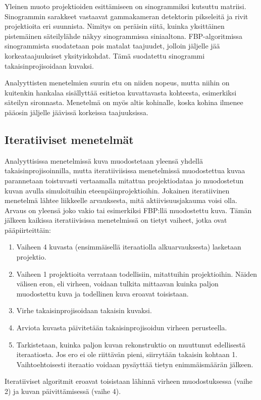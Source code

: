 Yleinen muoto projektioiden esittämiseen on sinogrammiksi kutsuttu matriisi. Sinogrammin sarakkeet vastaavat gammakameran detektorin pikseleitä ja rivit projektioita eri suunnista\cite{stiller_basics_2018}. Nimitys on peräisin siitä, kuinka yksittäinen pistemäinen säteilylähde näkyy sinogrammissa siniaaltona. FBP-algoritmissa sinogrammista suodatetaan pois matalat taajuudet, jolloin jäljelle jää korkeataajuuksiset yksityiskohdat. Tämä suodatettu sinogrammi takaisinprojisoidaan kuvaksi\cite{bruyant_analytic_2002, willemink_evolution_2019}.

Analyyttisten menetelmien suurin etu on niiden nopeus, mutta niihin on kuitenkin hankalaa sisällyttää esitietoa kuvattavasta kohteesta, esimerkiksi säteilyn sironnasta. Menetelmä on myös altis kohinalle, koska kohina ilmenee pääosin jäljelle jäävissä korkeissa taajuuksissa.\cite{bruyant_analytic_2002, willemink_evolution_2019, stiller_basics_2018}

\subsection{Iteratiiviset menetelmät}
Analyyttisissa menetelmissä kuva muodostetaan yleensä yhdellä takaisinprojisoinnilla, mutta iteratiiviisissa menetelmissä muodostettua kuvaa parannetaan toistuvasti vertaamalla mitattua projektiodataa jo muodostetun kuvan avulla simuloituihin eteenpäinprojektioihin. Jokainen iteratiivinen menetelmä lähtee liikkeelle arvauksesta, mitä aktiivisuusjakauma voisi olla. Arvaus on yleensä joko vakio tai esimerkiksi FBP:llä muodostettu kuva. Tämän jälkeen kaikissa iteratiivisissa menetelmissä on tietyt vaiheet, jotka ovat pääpiirteittäin\cite{bruyant_analytic_2002, beister_iterative_2012, stiller_basics_2018, ljungberg_spectct_2018}:
\begin{enumerate}[1.]
    \item Vaiheen 4 kuvasta (ensimmäisellä iteraatiolla alkuarvauksesta) lasketaan projektio. 
    \item Vaiheen 1 projektioita verrataan todellisiin, mitattuihin projektioihin. Näiden välisen eron, eli virheen, voidaan tulkita mittaavan kuinka paljon muodostettu kuva ja todellinen kuva eroavat toisistaan.
    \item Virhe takaisinprojisoidaan takaisin kuvaksi. 
    \item Arviota kuvasta päivitetään takaisinprojisoidun virheen perusteella.
    \item Tarkistetaan, kuinka paljon kuvan rekonstruktio on muuttunut edellisestä iteraatiosta. Jos ero ei ole riittävän pieni, siirrytään takaisin kohtaan 1. Vaihtoehtoisesti iteraatio voidaan pysäyttää tietyn enimmäismäärän jälkeen.
\end{enumerate}
Iteratiiviset algoritmit eroavat toisistaan lähinnä virheen muodostuksessa (vaihe 2) ja kuvan päivittämisessä (vaihe 4)\cite{bruyant_analytic_2002}.

